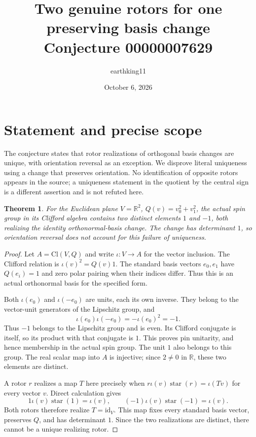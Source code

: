 \documentclass[11pt]{article}
\title{Two genuine rotors for one preserving basis change\\Conjecture 00000007629}
\author{earthking11}
\date{October 6, 2026}
\newtheorem{theorem}{Theorem}
\begin{document}
\maketitle
\section*{Statement and precise scope}
The conjecture states that rotor realizations of orthogonal basis changes
are unique, with orientation reversal as an exception. We disprove literal
uniqueness using a change that preserves orientation. No identification of
opposite rotors appears in the source; a uniqueness statement in the quotient
by the central sign is a different assertion and is not refuted here.

\begin{theorem}
For the Euclidean plane $V=\mathbb R^2$, $Q(v)=v_0^2+v_1^2$, the actual
spin group in its Clifford algebra contains two distinct elements $1$ and
$-1$, both realizing the identity orthonormal-basis change. The change has
determinant $1$, so orientation reversal does not account for this failure
of uniqueness.
\end{theorem}
\begin{proof}
Let $A=\mathrm{Cl}(V,Q)$ and write $\iota:V\to A$ for the vector inclusion.
The Clifford relation is $\iota(v)^2=Q(v)1$. The standard basis vectors
$e_0,e_1$ have $Q(e_i)=1$ and zero polar pairing when their indices differ.
Thus this is an actual orthonormal basis for the specified form.

Both $\iota(e_0)$ and $\iota(-e_0)$ are units, each its own inverse. They
belong to the vector-unit generators of the Lipschitz group, and
\[
  \iota(e_0)\iota(-e_0)=-\iota(e_0)^2=-1.
\]
Thus $-1$ belongs to the Lipschitz group and is even. Its Clifford
conjugate is itself, so its product with that conjugate is $1$. This proves
pin unitarity, and hence membership in the actual spin group. The unit $1$
also belongs to this group. The real scalar map into $A$ is injective;
since $2\neq0$ in $\mathbb R$, these two elements are distinct.

A rotor $r$ realizes a map $T$ here precisely when
$r\iota(v)\operatorname{star}(r)=\iota(Tv)$ for every vector $v$.
Direct calculation gives
\[
  1\iota(v)\operatorname{star}(1)=\iota(v),\qquad
  (-1)\iota(v)\operatorname{star}(-1)=\iota(v).
\]
Both rotors therefore realize $T=\mathrm{id}_V$. This map fixes every
standard basis vector, preserves $Q$, and has determinant $1$. Since the
two realizations are distinct, there cannot be a unique realizing rotor.
\end{proof}
\end{document}
